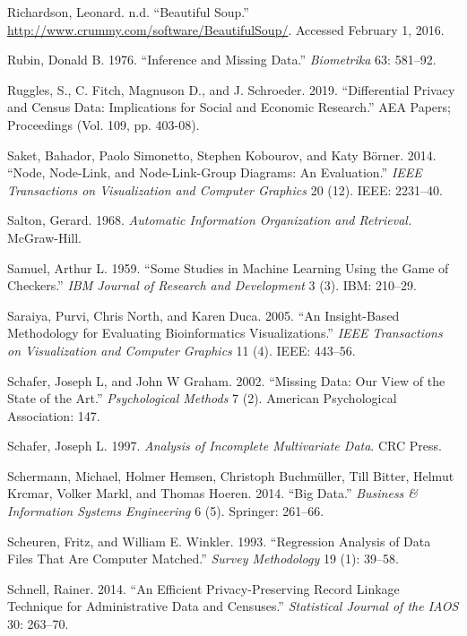 \documentclass[]{krantz}
\begin{document}
\hypertarget{ref-bsoup}{}
Richardson, Leonard. n.d. ``Beautiful Soup.''
\url{http://www.crummy.com/software/BeautifulSoup/}. Accessed February
1, 2016.

\hypertarget{ref-rubin1976}{}
Rubin, Donald B. 1976. ``Inference and Missing Data.'' \emph{Biometrika}
63: 581--92.

\hypertarget{ref-ruggles2019}{}
Ruggles, S., C. Fitch, Magnuson D., and J. Schroeder. 2019.
``Differential Privacy and Census Data: Implications for Social and
Economic Research.'' AEA Papers; Proceedings (Vol. 109, pp. 403-08).

\hypertarget{ref-saket2014node}{}
Saket, Bahador, Paolo Simonetto, Stephen Kobourov, and Katy Börner.
2014. ``Node, Node-Link, and Node-Link-Group Diagrams: An Evaluation.''
\emph{IEEE Transactions on Visualization and Computer Graphics} 20 (12).
IEEE: 2231--40.

\hypertarget{ref-salton-68}{}
Salton, Gerard. 1968. \emph{Automatic Information Organization and
Retrieval.} McGraw-Hill.

\hypertarget{ref-samuel1959some}{}
Samuel, Arthur L. 1959. ``Some Studies in Machine Learning Using the
Game of Checkers.'' \emph{IBM Journal of Research and Development} 3
(3). IBM: 210--29.

\hypertarget{ref-saraiya2005insight}{}
Saraiya, Purvi, Chris North, and Karen Duca. 2005. ``An Insight-Based
Methodology for Evaluating Bioinformatics Visualizations.'' \emph{IEEE
Transactions on Visualization and Computer Graphics} 11 (4). IEEE:
443--56.

\hypertarget{ref-schafer2002missing}{}
Schafer, Joseph L, and John W Graham. 2002. ``Missing Data: Our View of
the State of the Art.'' \emph{Psychological Methods} 7 (2). American
Psychological Association: 147.

\hypertarget{ref-schafer1997analysis}{}
Schafer, Joseph L. 1997. \emph{Analysis of Incomplete Multivariate
Data}. CRC Press.

\hypertarget{ref-schermann2014big}{}
Schermann, Michael, Holmer Hemsen, Christoph Buchmüller, Till Bitter,
Helmut Krcmar, Volker Markl, and Thomas Hoeren. 2014. ``Big Data.''
\emph{Business \& Information Systems Engineering} 6 (5). Springer:
261--66.

\hypertarget{ref-scheuren1993regression}{}
Scheuren, Fritz, and William E. Winkler. 1993. ``Regression Analysis of
Data Files That Are Computer Matched.'' \emph{Survey Methodology} 19
(1): 39--58.

\hypertarget{ref-schnell2014efficient}{}
Schnell, Rainer. 2014. ``An Efficient Privacy-Preserving Record Linkage
Technique for Administrative Data and Censuses.'' \emph{Statistical
Journal of the IAOS} 30: 263--70.
\end{document}
